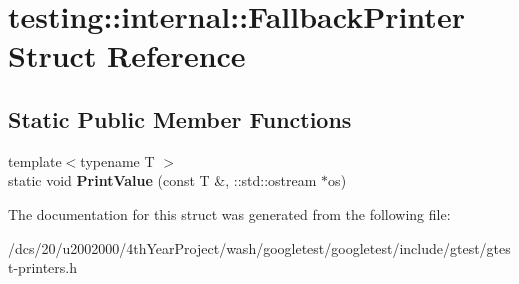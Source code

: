 \hypertarget{structtesting_1_1internal_1_1FallbackPrinter}{}\section{testing\+:\+:internal\+:\+:Fallback\+Printer Struct Reference}
\label{structtesting_1_1internal_1_1FallbackPrinter}
\subsection*{Static Public Member Functions}
\begin{DoxyCompactItemize}
\item 
\mbox{\label{structtesting_1_1internal_1_1FallbackPrinter_aa3d4df19d34336f93cf0c004672da9e8}} 
{\footnotesize template$<$typename T $>$ }\\static void {\bfseries Print\+Value} (const T \&, \+::std\+::ostream $\ast$os)
\end{DoxyCompactItemize}


The documentation for this struct was generated from the following file\+:\begin{DoxyCompactItemize}
\item 
/dcs/20/u2002000/4th\+Year\+Project/wash/googletest/googletest/include/gtest/gtest-\/printers.\+h\end{DoxyCompactItemize}
